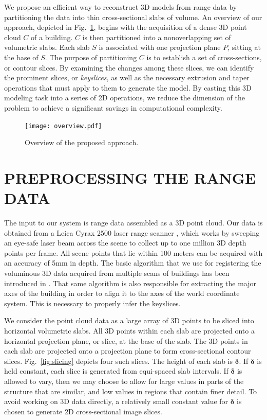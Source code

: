 \documentclass{article}
\newcommand{\Fig}[1]{Fig.~\ref{fig:#1}}
\begin{document}
We propose an efficient way to reconstruct 3D models from range data by
partitioning the data into thin cross-sectional slabs of volume.
An overview of our approach, depicted in \Fig{ov}, begins with the
acquisition of a dense 3D point cloud $C$ of a building.
$C$ is then partitioned into a nonoverlapping set of volumetric slabs.
Each slab $S$ is associated with one projection plane $P$,
sitting at the base of $S$.
The purpose of partitioning $C$ is to establish a set of cross-sections,
or contour slices.
By examining the changes among these slices, we can identify the prominent
slices, or {\it keyslices}, as well as the necessary extrusion and
taper operations that must apply to them to generate the model.
By casting this 3D modeling task into a series of 2D operations, we
reduce the dimension of the problem to achieve a significant savings in
computational complexity.

\begin{figure}[htbp]
\begin{center}
\texttt{[image: overview.pdf]}
\end{center}
\caption{Overview of the proposed approach.}
\label{fig:ov}
\end{figure}

\section{PREPROCESSING THE RANGE DATA}
\label{sec:prepdata}

The input to our system is range data assembled as a 3D point cloud.
Our data is obtained from a Leica Cyrax 2500 laser range scanner \cite{RDP_LRS},
which works by sweeping an eye-safe laser beam across the scene to collect
up to one million 3D depth points per frame.
All scene points that lie within 100 meters can be acquired with an accuracy
of 5mm in depth.
The basic algorithm that we use for registering the voluminous 3D data
acquired from multiple scans of buildings has been introduced in
\cite{RDP_LS}.
That same algorithm is also responsible for extracting the major axes
of the building in order to align it to the axes of the world coordinate
system.
This is necessary to properly infer the keyslices.

We consider the point cloud data as a large array of 3D points to be
sliced into horizontal volumetric slabs.
All 3D points within each slab are projected onto a horizontal projection
plane, or slice, at the base of the slab.
The 3D points in each slab are projected onto a projection plane to
form cross-sectional contour slices.
\Fig{slicing} depicts four such slices.
The height of each slab is $\boldsymbol{\delta}$.
If $\boldsymbol{\delta}$ is held constant, each slice is generated from
equi-spaced slab intervals.
If $\boldsymbol{\delta}$ is allowed to vary, then we may
choose to allow for large values in parts of the structure that are similar,
and low values in regions that contain finer detail.
To avoid working on 3D data directly, a relatively small constant value
for $\boldsymbol{\delta}$ is chosen to generate 2D cross-sectional image slices.
\end{document}
